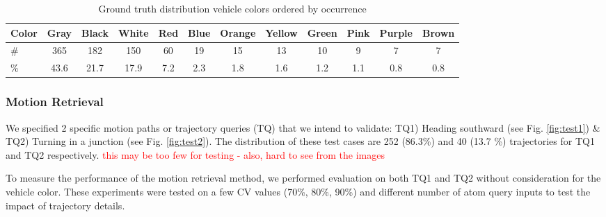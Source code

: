 \documentclass[runningheads]{llncs}
\newcommand\tab[1][1cm]{\hspace*{#1}}
\newcommand{\ian}[1]{\textcolor{red}{#1}}
\newcommand{\ian}[1]{}   %
\begin{document}
\vspace{-0.5em}
\begin{table}[t!]
	\centering
	\caption{Ground truth distribution vehicle colors ordered by occurrence}
    \label{table:colorDist}
	\begin{tabular}{lccccccccccc}
		\toprule
			Color\quad & Gray & Black & White & Red & Blue & Orange & Yellow & Green & Pink & Purple & Brown \\
		\midrule
        \# & 365 & 182 & 150 & 60 & 19 & 15 & 13 & 10 & 9 & 7 & 7 \\
        \% & 43.6 & 21.7 & 17.9 & 7.2 & 2.3 & 1.8 & 1.6 & 1.2 & 1.1 & 0.8 & 0.8 \\
		\bottomrule
	\end{tabular}
    \vspace{-1em}
\end{table}

\subsubsection{Motion Retrieval} \tab

We specified 2 specific motion paths or trajectory queries (TQ) that we intend to validate: TQ1) Heading southward (see Fig. \ref{fig:test1}) \& TQ2) Turning in a junction (see Fig. \ref{fig:test2}). The distribution of these test cases are 252 (86.3\%) and 40 (13.7 \%) trajectories for TQ1 and TQ2 respectively. \ian{this may be too few for testing - also, hard to see from the images}

To measure the performance of the motion retrieval method, we performed evaluation on both TQ1 and TQ2 without consideration for the vehicle color. These experiments were tested on a few CV values (70\%, 80\%, 90\%) and different
number of atom query inputs to test the impact of trajectory details.
\end{document}
